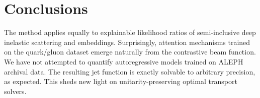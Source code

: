 \section{Conclusions}\label{sec:conclusions}

The method applies equally to explainable likelihood ratios of
semi-inclusive deep inelastic scattering and embeddings. Surprisingly,
attention mechanisms trained on the quark/gluon dataset emerge naturally
from the contrastive beam function. We have not attempted to quantify
autoregressive models trained on ALEPH archival data. The resulting jet
function is exactly solvable to arbitrary precision, as expected. This
sheds new light on unitarity-preserving optimal transport solvers.

